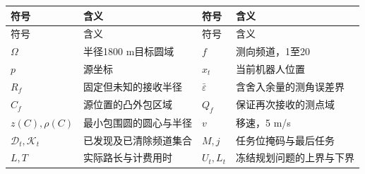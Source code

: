 \documentclass[UTF8,zihao=-4,fontset=fandol]{ctexart}
\begin{document}
\begin{longtable}[]{@{}
  >{\raggedright\arraybackslash}p{}
  >{\raggedright\arraybackslash}p{}
  >{\raggedright\arraybackslash}p{}
  >{\raggedright\arraybackslash}p{}@{}}

\toprule\noalign{}
\begin{minipage}[b]{\linewidth}\raggedright
符号
\end{minipage} & \begin{minipage}[b]{\linewidth}\raggedright
含义
\end{minipage} & \begin{minipage}[b]{\linewidth}\raggedright
符号
\end{minipage} & \begin{minipage}[b]{\linewidth}\raggedright
含义
\end{minipage} \\
\midrule\noalign{}
\endfirsthead
\toprule\noalign{}
\begin{minipage}[b]{\linewidth}\raggedright
符号
\end{minipage} & \begin{minipage}[b]{\linewidth}\raggedright
含义
\end{minipage} & \begin{minipage}[b]{\linewidth}\raggedright
符号
\end{minipage} & \begin{minipage}[b]{\linewidth}\raggedright
含义
\end{minipage} \\
\midrule\noalign{}
\endhead
\bottomrule\noalign{}
\endlastfoot
\(\Omega\) & 半径1800 m目标圆域 & \(f\) & 测向频道，1至20 \\
\(p\) & 源坐标 & \(x_t\) & 当前机器人位置 \\
\(R_f\) & 固定但未知的接收半径 & \(\bar\varepsilon\) & 含舍入余量的测角误差界 \\
\(\widehat C_f\) & 源位置的凸外包区域 & \(Q_f\) & 保证再次接收的测点域 \\
\(z(C),\rho(C)\) & 最小包围圆的圆心与半径 & \(v\) & 移速，5 m/s \\
\(\mathcal D_t,\mathcal K_t\) & 已发现及已清除频道集合 & \(M,j\) & 任务位掩码与最后任务 \\
\(L,T\) & 实际路长与计费用时 & \(U_t,L_t\) & 冻结规划问题的上界与下界 \\
\end{longtable}
\end{document}
